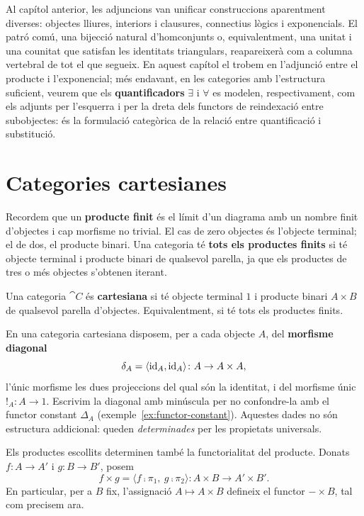 Al capítol anterior, les adjuncions van unificar construccions aparentment diverses: objectes lliures, interiors i clausures, connectius lògics i exponencials. El patró comú, una bijecció natural d'homconjunts o, equivalentment, una unitat i una counitat que satisfan les identitats triangulars, reapareixerà com a columna vertebral de tot el que segueix. En aquest capítol el trobem en l'adjunció entre el producte i l'exponencial; més endavant, en les categories amb l'estructura suficient, veurem que els \textbf{quantificadors} $\exists$ i $\forall$ es modelen, respectivament, com els adjunts per l'esquerra i per la dreta dels functors de reindexació entre subobjectes: és la formulació categòrica de la relació entre quantificació i substitució.

\section{Categories cartesianes}

Recordem que un \textbf{producte finit} és el límit d'un diagrama amb un nombre finit d'objectes i cap morfisme no trivial. El cas de zero objectes és l'objecte terminal; el de dos, el producte binari. Una categoria té \textbf{tots els productes finits} si té objecte terminal i producte binari de qualsevol parella, ja que els productes de tres o més objectes s'obtenen iterant.

\begin{definicio}
\label{def:cartesiana}
Una categoria $\cat{C}$ és \textbf{cartesiana} si té objecte terminal $1$ i producte binari $A\times B$ de qualsevol parella d'objectes. Equivalentment, si té tots els productes finits.
\end{definicio}

En una categoria cartesiana disposem, per a cada objecte $A$, del \textbf{morfisme diagonal}
\[
\delta_A=\langle\operatorname{id}_A,\operatorname{id}_A\rangle\colon A\to A\times A,
\]
l'únic morfisme les dues projeccions del qual són la identitat, i del morfisme únic $!_A\colon A\to 1$. Escrivim la diagonal amb minúscula per no confondre-la amb el functor constant $\Delta_A$ (exemple~\ref{ex:functor-constant}). Aquestes dades no són estructura addicional: queden \emph{determinades} per les propietats universals.

Els productes escollits determinen també la functorialitat del producte. Donats $f\colon A\to A'$ i $g\colon B\to B'$, posem
\[
f\times g=\langle f\comp\pi_1,\ g\comp\pi_2\rangle\colon A\times B\to A'\times B'.
\]
En particular, per a $B$ fix, l'assignació $A\mapsto A\times B$ defineix el functor $-\times B$, tal com precisem ara.

